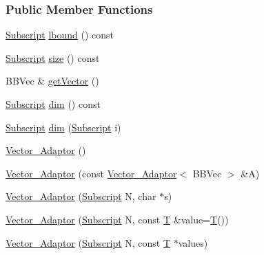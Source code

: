 \subsubsection*{Public Member Functions}
\begin{DoxyCompactItemize}
\item 
\hyperlink{namespace_t_n_t_af22e3f1460e145c04ce4e7d701e4c1c1}{Subscript} \hyperlink{class_t_n_t_1_1_vector___adaptor_ac892211682fc9910d8d3099cd56e7808}{lbound} () const 
\item 
\hyperlink{namespace_t_n_t_af22e3f1460e145c04ce4e7d701e4c1c1}{Subscript} \hyperlink{class_t_n_t_1_1_vector___adaptor_aa4e4733cf6836df75e84480a8886ad42}{size} () const 
\item 
BBVec \& \hyperlink{class_t_n_t_1_1_vector___adaptor_acf18d3d04e8a0c54f381de5b9979e42f}{getVector} ()
\item 
\hyperlink{namespace_t_n_t_af22e3f1460e145c04ce4e7d701e4c1c1}{Subscript} \hyperlink{class_t_n_t_1_1_vector___adaptor_a74bbe865894d7631fa79cf6c27f2e59d}{dim} () const 
\item 
\hyperlink{namespace_t_n_t_af22e3f1460e145c04ce4e7d701e4c1c1}{Subscript} \hyperlink{class_t_n_t_1_1_vector___adaptor_a446b0bd45c8aa9bebf034dcd87e874e9}{dim} (\hyperlink{namespace_t_n_t_af22e3f1460e145c04ce4e7d701e4c1c1}{Subscript} i)
\item 
\hyperlink{class_t_n_t_1_1_vector___adaptor_a35b22fd7141f88455bd1514392394416}{Vector\_\-Adaptor} ()
\item 
\hyperlink{class_t_n_t_1_1_vector___adaptor_a54ec6c9fe031ed1af10b5d33e5122d30}{Vector\_\-Adaptor} (const \hyperlink{class_t_n_t_1_1_vector___adaptor}{Vector\_\-Adaptor}$<$ BBVec $>$ \&A)
\item 
\hyperlink{class_t_n_t_1_1_vector___adaptor_a2882058865bfecf125f89090fd1864a3}{Vector\_\-Adaptor} (\hyperlink{namespace_t_n_t_af22e3f1460e145c04ce4e7d701e4c1c1}{Subscript} N, char $\ast$s)
\item 
\hyperlink{class_t_n_t_1_1_vector___adaptor_a8de16140bb85d7a6075bc2de203f8da7}{Vector\_\-Adaptor} (\hyperlink{namespace_t_n_t_af22e3f1460e145c04ce4e7d701e4c1c1}{Subscript} N, const \hyperlink{class_t_n_t_1_1_vector___adaptor_a8f689dfb94d76130f5327e00f2d10b97}{T} \&value=\hyperlink{class_t_n_t_1_1_vector___adaptor_a8f689dfb94d76130f5327e00f2d10b97}{T}())
\item 
\hyperlink{class_t_n_t_1_1_vector___adaptor_a4d718957009b1cf5d05eb79d1905edca}{Vector\_\-Adaptor} (\hyperlink{namespace_t_n_t_af22e3f1460e145c04ce4e7d701e4c1c1}{Subscript} N, const \hyperlink{class_t_n_t_1_1_vector___adaptor_a8f689dfb94d76130f5327e00f2d10b97}{T} $\ast$values)

\end{DoxyCompactItemize}
